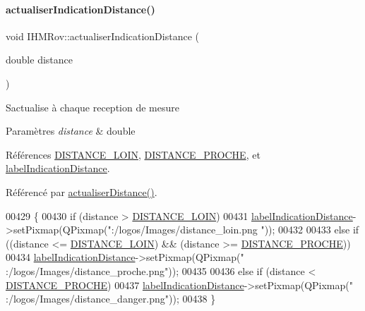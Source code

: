 \paragraph{\texorpdfstring{actualiser\+Indication\+Distance()}{actualiserIndicationDistance()}}
{\footnotesize\ttfamily void I\+H\+M\+Rov\+::actualiser\+Indication\+Distance (\begin{DoxyParamCaption}\item[{double}]{distance }\end{DoxyParamCaption})\hspace{0.3cm}{\ttfamily [private]}}

S\textquotesingle{}actualise à chaque reception de mesure


\begin{DoxyParams}{Paramètres}
{\em distance} & double \\
\hline
\end{DoxyParams}


Références \hyperlink{ihmrov_8h_aa986e54d0a0e08e8e32fc991c2186c09}{D\+I\+S\+T\+A\+N\+C\+E\+\_\+\+L\+O\+IN}, \hyperlink{ihmrov_8h_a90b48491a3e4dbe15f8255efe530e41a}{D\+I\+S\+T\+A\+N\+C\+E\+\_\+\+P\+R\+O\+C\+HE}, et \hyperlink{class_i_h_m_rov_a14e8fc8b6a1f95e974b550fd54088581}{label\+Indication\+Distance}.



Référencé par \hyperlink{class_i_h_m_rov_a891d51cf532d9cc8fc56c63a0c61e663}{actualiser\+Distance()}.


\begin{DoxyCode}
00429 \{
00430     \textcolor{keywordflow}{if} (distance > \hyperlink{ihmrov_8h_aa986e54d0a0e08e8e32fc991c2186c09}{DISTANCE\_LOIN})
00431         \hyperlink{class_i_h_m_rov_a14e8fc8b6a1f95e974b550fd54088581}{labelIndicationDistance}->setPixmap(QPixmap(\textcolor{stringliteral}{":/logos/Images/distance\_loin.png
      "}));
00432 
00433     \textcolor{keywordflow}{else} \textcolor{keywordflow}{if} ((distance <= \hyperlink{ihmrov_8h_aa986e54d0a0e08e8e32fc991c2186c09}{DISTANCE\_LOIN}) && (distance >= 
      \hyperlink{ihmrov_8h_a90b48491a3e4dbe15f8255efe530e41a}{DISTANCE\_PROCHE}))
00434         \hyperlink{class_i_h_m_rov_a14e8fc8b6a1f95e974b550fd54088581}{labelIndicationDistance}->setPixmap(QPixmap(\textcolor{stringliteral}{"
      :/logos/Images/distance\_proche.png"}));
00435 
00436     \textcolor{keywordflow}{else} \textcolor{keywordflow}{if} (distance < \hyperlink{ihmrov_8h_a90b48491a3e4dbe15f8255efe530e41a}{DISTANCE\_PROCHE})
00437         \hyperlink{class_i_h_m_rov_a14e8fc8b6a1f95e974b550fd54088581}{labelIndicationDistance}->setPixmap(QPixmap(\textcolor{stringliteral}{"
      :/logos/Images/distance\_danger.png"}));
00438 \}
\end{DoxyCode}
\mbox{\label{class_i_h_m_rov_a9a5108ce8f73fad9a38d02881ec5ae62}} 
